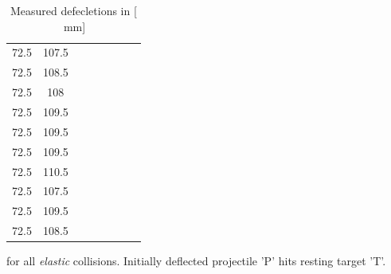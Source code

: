 \documentclass{scrreprt}
\newcommand{\unit}[1]{\ensuremath{\, \mathrm{#1}}}
\renewcommand{\emph}[1]{\textit{#1}}
\begin{document}
\begin{table}[H]
\begin{tabular}{ccp{1.5cm}ccp{1.5cm}cc}
     72.5 &         107.5 &            &            &            &            &            &            \\
     72.5 &         108.5 &            &            &            &            &            &            \\
     72.5 &         108 &            &            &            &            &            &            \\
     72.5 &         109.5 &            &            &            &            &            &            \\
     72.5 &         109.5 &            &            &            &            &            &            \\
     72.5 &         109.5 &            &            &            &            &            &            \\
     72.5 &         110.5 &            &            &            &            &            &            \\
     72.5 &         107.5 &            &            &            &            &            &            \\
     72.5 &         109.5 &            &            &            &            &            &            \\
     72.5 &         108.5 &            &            &            &            &            &            \\
\end{tabular}  
\caption{Measured defecletions in [$\unit{mm}$]} for all \emph{elastic} collisions. Initially deflected projectile 'P' hits resting target 'T'.   
\end{table}
\end{document}
